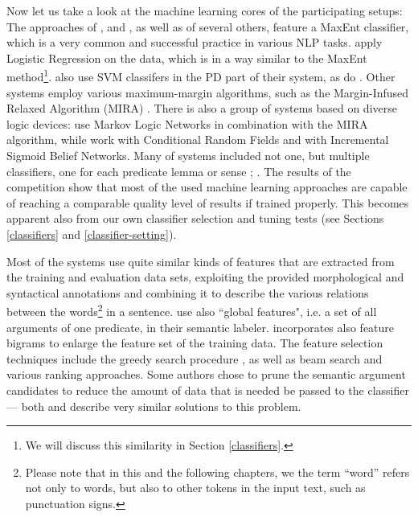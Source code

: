 \documentclass[12pt,notitlepage]{report}
\begin{document}
Now let us take a look at the machine learning cores of the participating setups: The approaches of \citet{zhao09}, \citet{che09} and \citet{chen09}, as well as of several others, feature a MaxEnt classifier, which is a very common and successful practice in various NLP tasks. \citet{nugues09} apply Logistic Regression on the data, which is in a way similar to the MaxEnt method\footnote{We will discuss this similarity in Section \ref{classifiers}.}. \citet{che09} also use SVM classifers in the PD part of their system, as do \citet{tackstrom09}. Other systems \citep{bohnet09,asahara09} employ various maximum-margin algorithms, such as the Margin-Infused Relaxed Algorithm (MIRA) \citep{crammer03}. There is also a group of systems based on diverse logic devices: \citet{meza-ruiz09} use Markov Logic Networks in combination with the MIRA algorithm, while \citet{moreau09} work with Conditional Random Fields and \citet{merlo09} with Incremental Sigmoid Belief Networks. Many of systems included not one, but multiple classifiers, one for each predicate lemma or sense \citep{che09}; \citep{nugues09}. The results of the competition show that most of the used machine learning approaches are capable of reaching a comparable quality level of results if trained properly. This becomes apparent also from our own classifier selection and tuning tests (see Sections \ref{classifiers} and \ref{classifier-setting}).

Most of the systems use quite similar kinds of features that are extracted from the training and evaluation data sets, exploiting the provided morphological and syntactical annotations and combining it to describe the various relations between the words\footnote{Please note that in this and the following chapters, we the term ``word'' refers not only to words, but also to other tokens in the input text, such as punctuation signs.} in a sentence. \citet{asahara09} use also ``global features", i.e. a set of all arguments of one predicate, in their semantic labeler. \citet{nugues09} incorporates also feature bigrams to enlarge the feature set of the training data. The feature selection techniques include the greedy search procedure \citep[among others]{nugues09,zeman09}, as well as beam search \citep[][and others]{merlo09,nugues09} and various ranking approaches. Some authors chose to prune the semantic argument candidates to reduce the amount of data that is needed be passed to the classifier --- both \citet{zhao09} and \citet{asahara09} describe very similar solutions to this problem.
\end{document}
